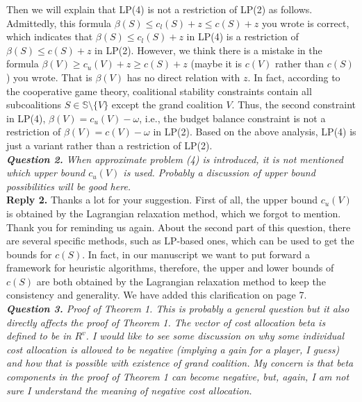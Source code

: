 \documentclass[11pt]{article}
\begin{document}
Then we will explain that LP(4) is not a restriction of LP(2) as follows.
Admittedly, this formula $\beta(S) \leq c_l(S) + z \leq c(S) + z$ you wrote is correct, which indicates that $\beta(S) \leq c_l(S) + z$ in LP(4) is a restriction of $\beta(S) \leq c(S) + z$ in LP(2).
However, we think there is a mistake in the formula $\beta(V) \geq c_u(V) + z \geq c(S) + z$ (maybe it is $c(V)$ rather than $c(S)$) you wrote. That is $\beta(V)$ has no direct relation with $z$.
In fact, according to the cooperative game theory, coalitional stability constraints contain all subcoalitions $S \in \mathbb{S} \setminus \big\{V\big\}$ except the grand coalition $V$.
Thus, the second constraint in LP(4), $\beta(V)=c_u(V)-\omega$, i.e., the budget balance constraint is not a restriction of $\beta(V)=c(V)-\omega$ in LP(2).
Based on the above analysis, LP(4) is just a variant rather than a restriction of LP(2).
\\[4mm]
%
%
%
\noindent \textit{\textbf{Question 2.}
When approximate problem (4) is introduced, it is not mentioned which upper bound $c_u(V)$ is used. Probably a discussion of upper bound possibilities will be good here.}
\\[2mm]
\noindent \textbf{Reply 2.}
Thanks a lot for your suggestion. First of all, the upper bound $c_u(V)$ is obtained by the Lagrangian relaxation method, which we forgot to mention. Thank you for reminding us again.
About the second part of this question, there are several specific methods, such as LP-based ones, which can be used to get the bounds for $c(S)$.
In fact, in our manuscript we want to put forward a framework for heuristic algorithms, therefore, the upper and lower bounds of $c(S)$ are both obtained by the Lagrangian relaxation method to keep the consistency and generality. We have added this clarification on page 7.
~\\[4mm]
%
%
%
\noindent \textit{\textbf{Question 3.}
Proof of Theorem 1. This is probably a general question but it also directly affects the proof of Theorem 1. The vector of cost allocation beta is defined to be in $R^v$.
I would like to see some discussion on why some individual cost allocation is allowed to be negative (implying a gain for a player, I guess) and how that is possible with existence of grand coalition. My concern is that beta components in the proof of Theorem 1 can become negative, but, again, I am not sure I understand the meaning of negative cost allocation.}
\end{document}
